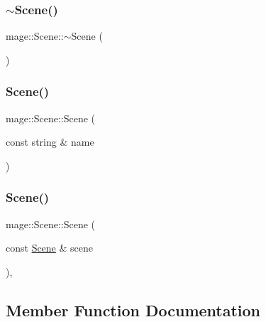 \subsubsection{\texorpdfstring{$\sim$\+Scene()}{~Scene()}}
{\footnotesize\ttfamily mage\+::\+Scene\+::$\sim$\+Scene (\begin{DoxyParamCaption}{ }\end{DoxyParamCaption})\hspace{0.3cm}{\ttfamily [default]}}

\hypertarget{classmage_1_1_scene_aab61b38547fc53aa9c5b3b559f4d2e26}{}\label{classmage_1_1_scene_aab61b38547fc53aa9c5b3b559f4d2e26} 
\subsubsection{\texorpdfstring{Scene()}{Scene()}\hspace{0.1cm}{\footnotesize\ttfamily [1/2]}}
{\footnotesize\ttfamily mage\+::\+Scene\+::\+Scene (\begin{DoxyParamCaption}\item[{const string \&}]{name }\end{DoxyParamCaption})\hspace{0.3cm}{\ttfamily [protected]}}

\hypertarget{classmage_1_1_scene_a88d83ccb2e10549d5370f850b2b4c228}{}\label{classmage_1_1_scene_a88d83ccb2e10549d5370f850b2b4c228} 
\subsubsection{\texorpdfstring{Scene()}{Scene()}\hspace{0.1cm}{\footnotesize\ttfamily [2/2]}}
{\footnotesize\ttfamily mage\+::\+Scene\+::\+Scene (\begin{DoxyParamCaption}\item[{const \hyperlink{classmage_1_1_scene}{Scene} \&}]{scene }\end{DoxyParamCaption})\hspace{0.3cm}{\ttfamily [private]}, {\ttfamily [delete]}}



\subsection{Member Function Documentation}
\hypertarget{classmage_1_1_scene_aa98dbf063994948dd2e434c7f0f6ee06}{}\label{classmage_1_1_scene_aa98dbf063994948dd2e434c7f0f6ee06} 

